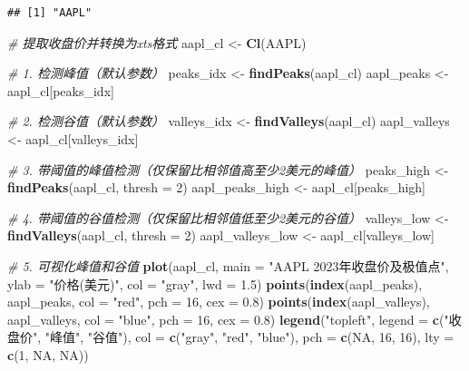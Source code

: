 \documentclass[]{ctexbook}
\newenvironment{Shaded}{\begin{snugshade}}{\end{snugshade}}
\newcommand{\AttributeTok}[1]{\textcolor[rgb]{0.13,0.29,0.53}{#1}}
\newcommand{\CommentTok}[1]{\textcolor[rgb]{0.56,0.35,0.01}{\textit{#1}}}
\newcommand{\ConstantTok}[1]{\textcolor[rgb]{0.56,0.35,0.01}{#1}}
\newcommand{\DecValTok}[1]{\textcolor[rgb]{0.00,0.00,0.81}{#1}}
\newcommand{\FloatTok}[1]{\textcolor[rgb]{0.00,0.00,0.81}{#1}}
\newcommand{\FunctionTok}[1]{\textcolor[rgb]{0.13,0.29,0.53}{\textbf{#1}}}
\newcommand{\NormalTok}[1]{#1}
\newcommand{\OtherTok}[1]{\textcolor[rgb]{0.56,0.35,0.01}{#1}}
\newcommand{\StringTok}[1]{\textcolor[rgb]{0.31,0.60,0.02}{#1}}
\begin{document}
\begin{verbatim}
## [1] "AAPL"
\end{verbatim}

\begin{Shaded}
\begin{Highlighting}[]
\CommentTok{\# 提取收盘价并转换为xts格式}
\NormalTok{aapl\_cl }\OtherTok{\textless{}{-}} \FunctionTok{Cl}\NormalTok{(AAPL)}

\CommentTok{\# 1. 检测峰值（默认参数）}
\NormalTok{peaks\_idx }\OtherTok{\textless{}{-}} \FunctionTok{findPeaks}\NormalTok{(aapl\_cl)}
\NormalTok{aapl\_peaks }\OtherTok{\textless{}{-}}\NormalTok{ aapl\_cl[peaks\_idx]}

\CommentTok{\# 2. 检测谷值（默认参数）}
\NormalTok{valleys\_idx }\OtherTok{\textless{}{-}} \FunctionTok{findValleys}\NormalTok{(aapl\_cl)}
\NormalTok{aapl\_valleys }\OtherTok{\textless{}{-}}\NormalTok{ aapl\_cl[valleys\_idx]}

\CommentTok{\# 3. 带阈值的峰值检测（仅保留比相邻值高至少2美元的峰值）}
\NormalTok{peaks\_high }\OtherTok{\textless{}{-}} \FunctionTok{findPeaks}\NormalTok{(aapl\_cl, }\AttributeTok{thresh =} \DecValTok{2}\NormalTok{)}
\NormalTok{aapl\_peaks\_high }\OtherTok{\textless{}{-}}\NormalTok{ aapl\_cl[peaks\_high]}

\CommentTok{\# 4. 带阈值的谷值检测（仅保留比相邻值低至少2美元的谷值）}
\NormalTok{valleys\_low }\OtherTok{\textless{}{-}} \FunctionTok{findValleys}\NormalTok{(aapl\_cl, }\AttributeTok{thresh =} \DecValTok{2}\NormalTok{)}
\NormalTok{aapl\_valleys\_low }\OtherTok{\textless{}{-}}\NormalTok{ aapl\_cl[valleys\_low]}

\CommentTok{\# 5. 可视化峰值和谷值}
\FunctionTok{plot}\NormalTok{(aapl\_cl, }\AttributeTok{main =} \StringTok{"AAPL 2023年收盘价及极值点"}\NormalTok{, }
     \AttributeTok{ylab =} \StringTok{"价格(美元)"}\NormalTok{, }\AttributeTok{col =} \StringTok{"gray"}\NormalTok{, }\AttributeTok{lwd =} \FloatTok{1.5}\NormalTok{)}
\FunctionTok{points}\NormalTok{(}\FunctionTok{index}\NormalTok{(aapl\_peaks), aapl\_peaks, }\AttributeTok{col =} \StringTok{"red"}\NormalTok{, }\AttributeTok{pch =} \DecValTok{16}\NormalTok{, }\AttributeTok{cex =} \FloatTok{0.8}\NormalTok{)}
\FunctionTok{points}\NormalTok{(}\FunctionTok{index}\NormalTok{(aapl\_valleys), aapl\_valleys, }\AttributeTok{col =} \StringTok{"blue"}\NormalTok{, }\AttributeTok{pch =} \DecValTok{16}\NormalTok{, }\AttributeTok{cex =} \FloatTok{0.8}\NormalTok{)}
\FunctionTok{legend}\NormalTok{(}\StringTok{"topleft"}\NormalTok{, }\AttributeTok{legend =} \FunctionTok{c}\NormalTok{(}\StringTok{"收盘价"}\NormalTok{, }\StringTok{"峰值"}\NormalTok{, }\StringTok{"谷值"}\NormalTok{), }
       \AttributeTok{col =} \FunctionTok{c}\NormalTok{(}\StringTok{"gray"}\NormalTok{, }\StringTok{"red"}\NormalTok{, }\StringTok{"blue"}\NormalTok{), }\AttributeTok{pch =} \FunctionTok{c}\NormalTok{(}\ConstantTok{NA}\NormalTok{, }\DecValTok{16}\NormalTok{, }\DecValTok{16}\NormalTok{), }\AttributeTok{lty =} \FunctionTok{c}\NormalTok{(}\DecValTok{1}\NormalTok{, }\ConstantTok{NA}\NormalTok{, }\ConstantTok{NA}\NormalTok{))}
\end{Highlighting}
\end{Shaded}
\end{document}
